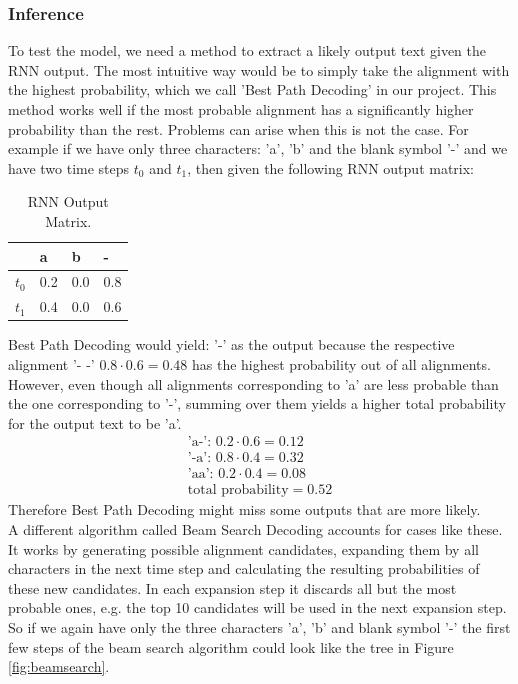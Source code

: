 \documentclass{article}
\begin{document}
\subsubsection{Inference}
To test the model, we need a method to extract a likely output text given the RNN output. The most intuitive way would be to simply take the alignment with the highest probability, which we call 'Best Path Decoding' in our project. This method works well if the most probable alignment has a significantly higher probability than the rest. Problems can arise when this is not the case. For example if we have only three characters: 'a', 'b' and the blank symbol '-' and we have two time steps \(t_0\) and \(t_1\), then given the following RNN output matrix:
\begin{table}[H]
\centering
\begin{tabular}{l|l|l|l}
\label{tab:RNNOutputProblem}
       & a & b & - \\ \hline
\(t_0\) & 0.2 & 0.0 & 0.8 \\ \hline
\(t_1\) & 0.4 & 0.0 & 0.6 \\ \hline
\end{tabular}
\caption{RNN Output Matrix.}
\end{table}
Best Path Decoding would yield: '-' as the output because the respective alignment '- -' \(0.8\cdot 0.6 = 0.48\) has the highest probability out of all alignments. However, even though all alignments corresponding to 'a' are less probable than the one corresponding to '-', summing over them yields a higher total probability for the output text to be 'a'. 
\[
\begin{split}
\text{'a-': } 0.2\cdot 0.6 = 0.12\\
\text{'-a': } 0.8\cdot 0.4 = 0.32\\
\text{'aa': } 0.2\cdot 0.4 = 0.08\\
\text{total probability} = 0.52
\end{split}
\]
Therefore Best Path Decoding might miss some outputs that are more likely.\\
A different algorithm called Beam Search Decoding accounts for cases like these. It works by generating possible alignment candidates, expanding them by all characters in the next time step and calculating the resulting probabilities of these new candidates. In each expansion step it discards all but the most probable ones, e.g. the top 10 candidates will be used in the next expansion step. So if we again have only the three characters 'a', 'b' and blank symbol '-' the first few steps of the beam search algorithm could look like the tree in Figure \ref{fig:beamsearch}.
\end{document}
